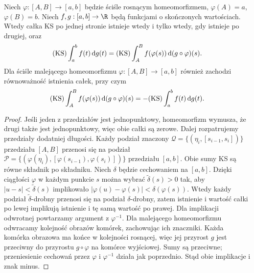 \begin{twierdzenie}
\label{tw:ks-substitution}
Niech $\varphi:[A,B]\to[a,b]$ będzie ściśle rosnącym homeomorfizmem, $\varphi(A)=a$, $\varphi(B)=b$. Niech $f,g:[a,b]\to\R$ będą funkcjami o skończonych wartościach. Wtedy całka KS po jednej stronie istnieje wtedy i tylko wtedy, gdy istnieje po drugiej, oraz
\[
 (\mathrm{KS})\int_a^b f(t)\,\mathrm dg(t)
 =(\mathrm{KS})\int_A^B f(\varphi(s))\,\mathrm d(g\circ\varphi)(s).
\]
Dla ściśle malejącego homeomorfizmu $\varphi:[A,B]\to[a,b]$ również zachodzi równoważność istnienia całek, przy czym
\[
 (\mathrm{KS})\int_A^B f(\varphi(s))\,\mathrm d(g\circ\varphi)(s)
 =-(\mathrm{KS})\int_a^b f(t)\,\mathrm dg(t).
\]
\end{twierdzenie}
\begin{proof}
Jeśli jeden z przedziałów jest jednopunktowy,
homeomorfizm wymusza, że drugi także jest jednopunktowy,
więc obie całki są zerowe. Dalej rozpatrujemy
przedziały dodatniej długości.
Każdy podział znaczony $\mathcal Q=\{(\eta_i,[s_{i-1},s_i])\}$ przedziału $[A,B]$ przenosi się na podział $\mathcal P=\{(\varphi(\eta_i),[\varphi(s_{i-1}),\varphi(s_i)])\}$ przedziału $[a,b]$. Obie sumy KS są równe składnik po składniku. Niech $\delta$ będzie cechowaniem na $[a,b]$. Dzięki ciągłości $\varphi$ w każdym punkcie $s$ można wybrać $\widetilde\delta(s)>0$ tak, aby $|u-s|<\widetilde\delta(s)$ implikowało $|\varphi(u)-\varphi(s)|<\delta(\varphi(s))$. Wtedy każdy podział $\widetilde\delta$-drobny przenosi się na podział $\delta$-drobny, zatem istnienie i wartość całki po lewej implikują istnienie i tę samą wartość po prawej. Dla implikacji odwrotnej powtarzamy argument z $\varphi^{-1}$.
Dla malejącego homeomorfizmu odwracamy kolejność obrazów komórek, zachowując ich znaczniki. Każda komórka obrazowa ma końce w kolejności rosnącej, więc jej przyrost $g$ jest przeciwny do przyrostu $g\circ\varphi$ na komórce wyjściowej. Sumy są przeciwne; przeniesienie cechowań przez $\varphi$ i $\varphi^{-1}$ działa jak poprzednio. Stąd obie implikacje i znak minus.
\end{proof}


